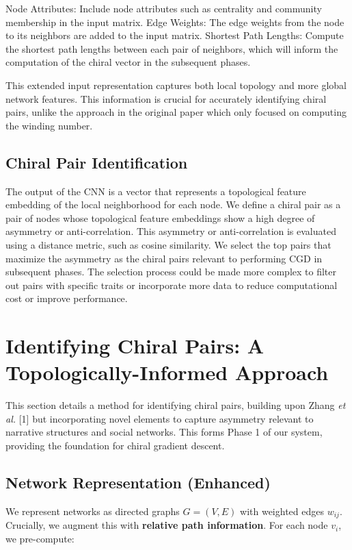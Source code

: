 \documentclass[12pt, a4paper]{article}
\begin{document}
Node Attributes:  Include node attributes such as centrality and community membership in the input matrix.
Edge Weights:  The edge weights from the node to its neighbors are added to the input matrix.
Shortest Path Lengths:  Compute the shortest path lengths between each pair of neighbors, which will inform the computation of the chiral vector in the subsequent phases.

This extended input representation captures both local topology and more global network features. This information is crucial for accurately identifying chiral pairs, unlike the approach in the original paper which only focused on computing the winding number.

\subsection{Chiral Pair Identification}

The output of the CNN is a vector that represents a topological feature embedding of the local neighborhood for each node.  We define a chiral pair as a pair of nodes whose topological feature embeddings show a high degree of asymmetry or anti-correlation. This asymmetry or anti-correlation is evaluated using a distance metric, such as cosine similarity. We select the top pairs that maximize the asymmetry as the chiral pairs relevant to performing CGD in subsequent phases.  The selection process could be made more complex to filter out pairs with specific traits or incorporate more data to reduce computational cost or improve performance.






\section{Identifying Chiral Pairs: A Topologically-Informed Approach}

This section details a method for identifying chiral pairs, building upon Zhang \textit{et al.} [1] but incorporating novel elements to capture asymmetry relevant to narrative structures and social networks. This forms Phase 1 of our system, providing the foundation for chiral gradient descent.

\subsection{Network Representation (Enhanced)}

We represent networks as directed graphs $G = (V, E)$ with weighted edges $w_{ij}$. Crucially, we augment this with \textbf{relative path information}. For each node $v_i$, we pre-compute:
\end{document}
